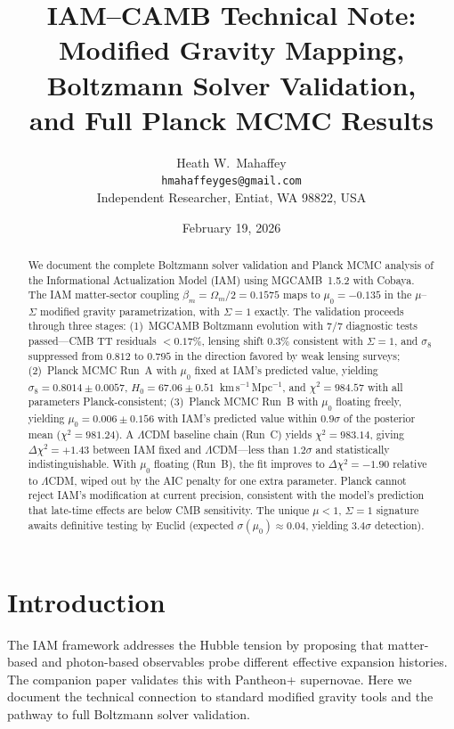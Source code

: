 \documentclass[11pt,letterpaper]{article}
\title{IAM--CAMB Technical Note:\\
Modified Gravity Mapping, Boltzmann Solver Validation,\\
and Full Planck MCMC Results}
\author{Heath W.\ Mahaffey\\
\texttt{hmahaffeyges@gmail.com}\\[4pt]
\small{Independent Researcher, Entiat, WA 98822, USA}}
\date{February 19, 2026}
\begin{document}
\maketitle

\begin{abstract}
We document the complete Boltzmann solver validation and Planck MCMC analysis of the Informational Actualization Model (IAM) using MGCAMB~1.5.2 with Cobaya. The IAM matter-sector coupling $\beta_m = \Omega_m/2 = 0.1575$ maps to $\mu_0 = -0.135$ in the $\mu$--$\Sigma$ modified gravity parametrization, with $\Sigma = 1$ exactly. The validation proceeds through three stages: (1)~MGCAMB Boltzmann evolution with 7/7 diagnostic tests passed---CMB TT residuals $< 0.17\%$, lensing shift $0.3\%$ consistent with $\Sigma = 1$, and $\sigma_8$ suppressed from $0.812$ to $0.795$ in the direction favored by weak lensing surveys; (2)~Planck MCMC Run~A with $\mu_0$ fixed at IAM's predicted value, yielding $\sigma_8 = 0.8014 \pm 0.0057$, $H_0 = 67.06 \pm 0.51$~km\,s$^{-1}$\,Mpc$^{-1}$, and $\chi^2 = 984.57$ with all parameters Planck-consistent; (3)~Planck MCMC Run~B with $\mu_0$ floating freely, yielding $\mu_0 = 0.006 \pm 0.156$ with IAM's predicted value within $0.9\sigma$ of the posterior mean ($\chi^2 = 981.24$). A $\Lambda$CDM baseline chain (Run~C) yields $\chi^2 = 983.14$, giving $\Delta\chi^2 = +1.43$ between IAM fixed and $\Lambda$CDM---less than $1.2\sigma$ and statistically indistinguishable. With $\mu_0$ floating (Run~B), the fit improves to $\Delta\chi^2 = -1.90$ relative to $\Lambda$CDM, wiped out by the AIC penalty for one extra parameter. Planck cannot reject IAM's modification at current precision, consistent with the model's prediction that late-time effects are below CMB sensitivity. The unique $\mu < 1$, $\Sigma = 1$ signature awaits definitive testing by Euclid (expected $\sigma(\mu_0) \approx 0.04$, yielding $3.4\sigma$ detection).
\end{abstract}

\tableofcontents

\section{Introduction}

The IAM framework addresses the Hubble tension by proposing that matter-based and photon-based observables probe different effective expansion histories. The companion paper \cite{DualSector2026} validates this with Pantheon+ supernovae. Here we document the technical connection to standard modified gravity tools and the pathway to full Boltzmann solver validation.
\end{document}
